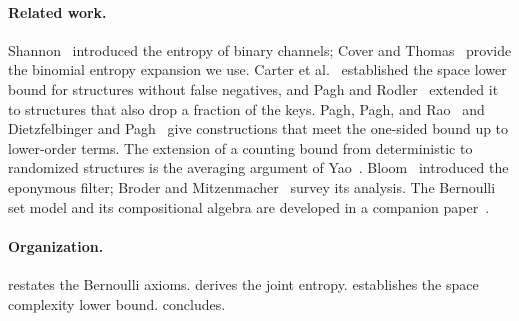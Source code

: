 \paragraph{Related work.}
Shannon~\cite{shannonBSC} introduced the entropy of binary channels; Cover and
Thomas~\cite{coverThomas} provide the binomial entropy expansion we use.
Carter et al.~\cite{carterExact} established the space lower bound for
structures without false negatives, and Pagh and
Rodler~\cite{paghRodlerLossy} extended it to structures that also drop a
fraction of the keys.
Pagh, Pagh, and Rao~\cite{paghPaghRao} and Dietzfelbinger and
Pagh~\cite{dietzfelbingerPagh} give constructions that meet the one-sided
bound up to lower-order terms.
The extension of a counting bound from deterministic to randomized
structures is the averaging argument of Yao~\cite{yaoMinimax}.
Bloom~\cite{bf} introduced the eponymous filter; Broder and
Mitzenmacher~\cite{broderMitzenmacher} survey its analysis.
The Bernoulli set model and its compositional algebra are developed in a
companion paper~\cite{bernoulliSets}.

\paragraph{Organization.}
 restates the Bernoulli axioms.
 derives the joint entropy.
 establishes the space complexity lower bound.
 concludes.
